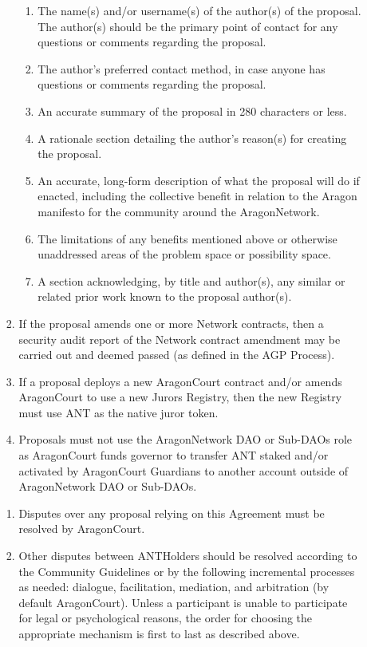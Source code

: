 \begin{enumerate}
\begin{enumerate}
\begin{enumerate}
			\begin{enumerate}
				\item The name(s) and/or username(s) of the author(s) of the proposal. The author(s) should be the primary point of contact for any questions or comments regarding the proposal.
				\item The author’s preferred contact method, in case anyone has questions or comments regarding the proposal.
				\item An accurate summary of the proposal in 280 characters or less.
				\item A rationale section detailing the author’s reason(s) for creating the
				proposal.
				\item An accurate, long-form description of what the proposal will do if
				enacted, including the collective benefit in relation to the Aragon
				manifesto for the community around the \gls{AragonNetwork}.
				\item The limitations of any benefits mentioned above or otherwise
				unaddressed areas of the problem space or possibility space.
				\item A section acknowledging, by title and author(s), any similar or
				related prior work known to the proposal author(s).
			\end{enumerate}
		
			\item If the proposal amends one or more Network contracts, then a security
			audit report of the Network contract amendment may be carried out and
			deemed passed (as defined in the \ac{AGP} Process).
			\item If a proposal deploys a new \gls{AragonCourt}  contract and/or
			amends \gls{AragonCourt} to use a new Jurors Registry, then the new 
			Registry must use \ac{ANT} as the native juror token.
			\item Proposals must not use the \gls{AragonNetwork} \ac{DAO} or Sub-\acp{DAO} role as
			\gls{AragonCourt} funds governor to transfer \ac{ANT} staked and/or activated by \gls{AragonCourt} \glspl{Guardian} to another account outside of \gls{AragonNetwork} \ac{DAO} or Sub-\acp{DAO}.
		\end{enumerate}

		\begin{enumerate}
			\item Disputes over any proposal relying on this Agreement must be resolved by \gls{AragonCourt}.
			\item Other disputes between \glspl{ANTHolder} should be resolved according to the Community Guidelines or by the following incremental processes as needed: dialogue, facilitation, mediation, and arbitration (by default \gls{AragonCourt}). Unless a participant is unable to participate for legal or psychological reasons, the order for choosing the appropriate mechanism is first to last as described above.
		\end{enumerate}


\end{enumerate}
\end{enumerate}
